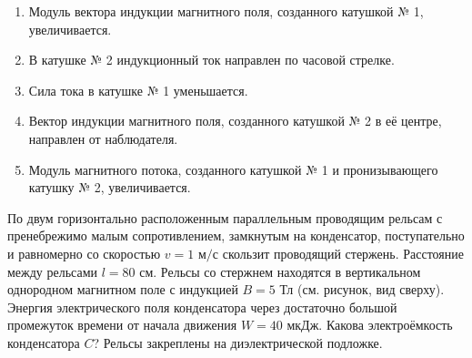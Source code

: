 \begin{enumerate}
    \item Модуль вектора индукции магнитного поля, созданного катушкой № 1, увеличивается.
    \item В катушке № 2 индукционный ток направлен по часовой стрелке.
    \item Сила тока в катушке № 1 уменьшается.
    \item Вектор индукции магнитного поля, созданного катушкой № 2 в её центре, направлен от наблюдателя.
    \item Модуль магнитного потока, созданного катушкой № 1 и пронизывающего катушку № 2, увеличивается.
\end{enumerate}

По двум горизонтально расположенным параллельным проводящим рельсам с пренебрежимо малым сопротивлением, замкнутым на конденсатор, поступательно и равномерно со скоростью \(v = 1 \text{ м/с}\) скользит проводящий стержень. Расстояние между рельсами \(l = 80 \text{ см}\). Рельсы со стержнем находятся в вертикальном однородном магнитном поле с индукцией \(B = 5 \text{ Тл}\) (см. рисунок, вид сверху). Энергия электрического поля конденсатора через достаточно большой промежуток времени от начала движения \(W = 40 \text{ мкДж}\). Какова электроёмкость конденсатора \(C\)? Рельсы закреплены на диэлектрической подложке.

\begin{center}
\end{center}

